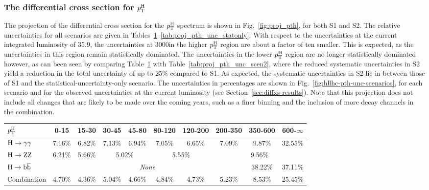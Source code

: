 \subsubsection{The differential cross section for \texorpdfstring{$p_\mathrm{T}^\mathrm{H}$}{pTH}}

The projection of the differential cross section for the $p_\mathrm{T}^\mathrm{H}$ spectrum is shown in Fig.~\ref{fig:proj_pth}, for both S1 and S2.
% 
The relative uncertainties for all scenarios are given in Tables~\ref{tab:proj_pth_unc_scen1}--\ref{tab:proj_pth_unc_statonly}.
% 
With respect to the uncertainties at the current integrated luminosity of 35.9\fbinv, the uncertainties at 3000\fbinv in the higher $p_\mathrm{T}^\mathrm{H}$ region are about a factor of ten smaller. This is expected, as the uncertainties in this region remain statistically dominated.
% 
The uncertainties in the lower $p_\mathrm{T}^\mathrm{H}$ region are no longer statistically dominated however, as can been seen by comparing Table~\ref{tab:proj_pth_unc_scen1} with Table~\ref{tab:proj_pth_unc_scen2}, where the reduced systematic uncertainties in S2 yield a reduction in the total uncertainty of up to 25\% compared to S1.
% 
As expected, the systematic uncertainties in S2 lie in between those of S1 and the statistical-uncertainty-only scenario.
% 
The uncertainties in percentages are shown in Fig.~\ref{fig:hllhc-pth-unc-scenarios}, for each scenario and for the observed uncertainties at the current luminosity (see Section~\ref{sec:diffxs-results}).
% 
Note that this projection does not include all changes that are likely to be made over the coming years, such as a finer binning and the inclusion of more decay channels in the combination.


\begin{table}[htb]
\centering
{}
\label{tab:proj_pth_unc_scen1}
\begin{tabular}{|l|c|c|c|c|c|c|c|c|c|}
\hline
$p_\mathrm{T}^\mathrm{H}$       & 0-15    &  15-30   &  30-45    &  45-80   &  80-120  &  120-200  &  200-350  &  350-600  &  600-$\infty$  \\
\hline
$\mathrm{H}\to\mathrm{\gamma}\mathrm{\gamma}$       & 7.16\%  &  6.82\%  &  7.13\%   &  6.94\%  &  7.05\%  &  6.65\%   &  7.09\%   &  9.87\%   &  32.55\%  \\
\hline
$\mathrm{H}\to\mathrm{Z}\mathrm{Z}$       & 6.21\%  &  5.66\%  &  \multicolumn{2}{c|}{5.02\%}  &  \multicolumn{2}{c|}{5.55\%}  &  \multicolumn{3}{c|}{9.56\%} \\
\hline
$\mathrm{H}\to\mathrm{b}\overline{\mathrm{b}}$       & \multicolumn{7}{c|}{\textit{None}}                                                       &  38.22\%  &  37.11\%  \\
\hline
Combination  & 4.70\%  &  4.36\%  &  5.04\%   &  4.66\%  &  4.84\%  &  4.73\%   &  5.23\%   &  8.53\%   &  25.45\%  \\
\hline
\end{tabular}
\end{table}

